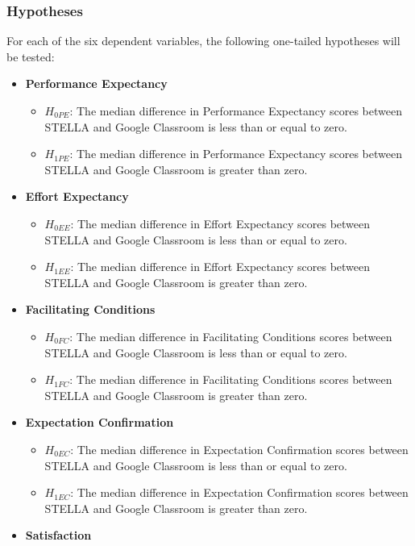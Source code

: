 \documentclass[sigconf,natbib=true]{acmart}
\begin{document}
\subsubsection{Hypotheses}
For each of the six dependent variables, the following one-tailed hypotheses will be tested:
\begin{itemize}
\item \textbf{Performance Expectancy}
  \begin{itemize} 
    \item $H_{0PE}$: The median difference in Performance Expectancy scores between STELLA and Google Classroom is less than or equal to zero.
    \item $H_{1PE}$: The median difference in Performance Expectancy scores between STELLA and Google Classroom is greater than zero.
  \end{itemize}
\item \textbf{Effort Expectancy}
  \begin{itemize} 
    \item $H_{0EE}$: The median difference in Effort Expectancy scores between STELLA and Google Classroom is less than or equal to zero.
    \item $H_{1EE}$: The median difference in Effort Expectancy scores between STELLA and Google Classroom is greater than zero.
  \end{itemize}
\item \textbf{Facilitating Conditions}
  \begin{itemize} 
    \item $H_{0FC}$: The median difference in Facilitating Conditions scores between STELLA and Google Classroom is less than or equal to zero.
    \item $H_{1FC}$: The median difference in Facilitating Conditions scores between STELLA and Google Classroom is greater than zero.
  \end{itemize}
\item \textbf{Expectation Confirmation}
  \begin{itemize} 
    \item $H_{0EC}$: The median difference in Expectation Confirmation scores between STELLA and Google Classroom is less than or equal to zero.
    \item $H_{1EC}$: The median difference in Expectation Confirmation scores between STELLA and Google Classroom is greater than zero.
  \end{itemize}
\item \textbf{Satisfaction}
  \begin{itemize} 

\end{itemize}
\end{itemize}
\end{document}

